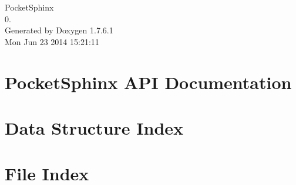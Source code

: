 \documentclass[a4paper]{book}
\begin{document}
\begin{titlepage}
\vspace*{7cm}
\begin{center}
{\Large \-Pocket\-Sphinx \\[1ex]\large 0. }\\
\vspace*{1cm}
{\large \-Generated by Doxygen 1.7.6.1}\\
\vspace*{0.5cm}
{\small Mon Jun 23 2014 15:21:11}\\
\end{center}
\end{titlepage}
\clearemptydoublepage
{}
\tableofcontents
\clearemptydoublepage
{}
\chapter{\-Pocket\-Sphinx \-A\-P\-I \-Documentation}
\label{index}
\chapter{\-Data \-Structure \-Index}

\chapter{\-File \-Index}

\end{document}
